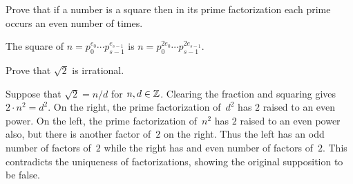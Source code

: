 \documentclass{test}  %
\begin{document}
\begin{problem}
\end{problem}

\begin{problem} 
\begin{exes}
\begin{exercise} 
  Prove that if a number is a square then in its prime factorization 
  each prime occurs an even number of times.
\end{exercise}
\begin{answer}
  The square of $n=p_0^{e_0}\cdots p_{s-1}^{e_{s-1}}$ is
  $n=p_0^{2e_0}\cdots p_{s-1}^{2e_{s-1}}$.  
\end{answer}
\begin{exercise} 
  Prove that $\sqrt{2}$ is irrational.
\end{exercise}
\begin{answer}
  Suppose that $\sqrt{2}=n/d$ for $n,d\in\mathbb{Z}$.
  Clearing the fraction and squaring gives $2\cdot n^2=d^2$.
  On the right, the prime factorization of~$d^2$ has $2$ raised to an even 
  power.
  On the left, the prime factorization of~$n^2$ has $2$ raised to an even power
  also, but there is another factor of~$2$ on the right.
  Thus the left has an odd number of factors of~$2$ while the right has
  and even number of factors of~$2$.
  This contradicts the uniqueness of factorizations, showing the 
  original supposition to be false.   
\end{answer}
\end{exes}

\end{problem}
\end{document}
